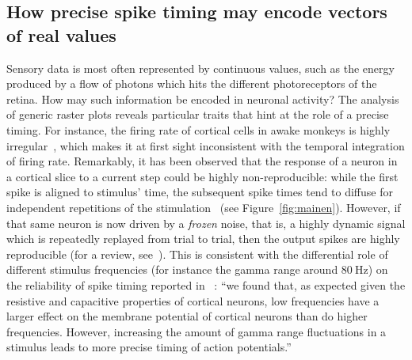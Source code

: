 \documentclass[brainsci, %
               review,submit,pdftex,moreauthors
               ]{Definitions/mdpi}
\begin{document}
\subsection{How precise spike timing may encode vectors of real values}
Sensory data is most often represented by continuous values, such as the energy produced by a flow of photons which hits the different photoreceptors of the retina. How may such information be encoded in neuronal activity? The analysis of generic raster plots reveals particular traits that hint at the role of a precise timing. For instance, the firing rate of cortical cells in awake monkeys is highly irregular~\citep{softky_highly_1993}, which makes it at first sight inconsistent with the temporal integration of firing rate. Remarkably, it has been observed that the response of a neuron in a cortical slice to a current step could be highly non-reproducible: while the first spike is aligned to stimulus' time, the subsequent spike times tend to diffuse for independent repetitions of the stimulation~\citep{mainen_reliability_1995} (see Figure~\ref{fig:mainen}). However, if that same neuron is now driven by a \emph{frozen} noise, that is, a highly dynamic signal which is repeatedly replayed from trial to trial, then the output spikes are highly reproducible (for a review, see~\citep{ermentrout_reliability_2008}). This is consistent with the differential role of different stimulus frequencies (for instance the gamma range around $80~\si{\Hz}$) on the reliability of spike timing reported in~\citep{nowak_influence_1997} : ``we found that, as expected given the resistive and capacitive properties of cortical neurons, low frequencies have a larger effect on the membrane potential of cortical neurons than do higher frequencies. However, increasing the amount of gamma range fluctuations in a stimulus leads to more precise timing of action potentials.'' 
\end{document}
